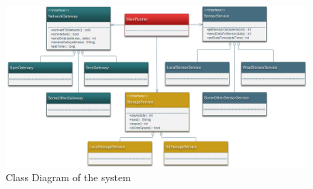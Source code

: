 \begin{figure}[H]
\centering
\includegraphics[width=1\linewidth]{graphics/ClassDiagram}
\caption{Class Diagram of the system\label{fig:ClassDiagram}}
\end{figure}

